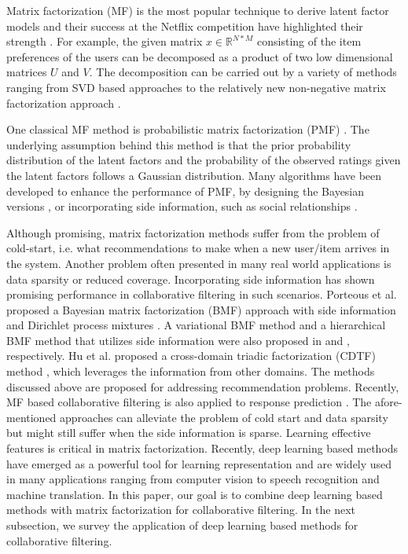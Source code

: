 \documentclass{sig-alternate-05-2015}
\begin{document}
Matrix factorization (MF) is the most popular technique to derive latent factor models and
their success at the Netflix competition have highlighted their strength \cite{koren2009matrix, bennett2007netflix}.
For example, the given matrix $x \in \mathbb{R}^{N*M}$ consisting of the item preferences of the users
can be decomposed as a product of two low dimensional matrices $U$ and $V$.
The decomposition can be carried out by a variety of methods ranging from SVD based approaches \cite{mazumder2010spectral}
to the relatively new non-negative matrix factorization approach \cite{lee2001algorithms}.

One classical MF method is probabilistic matrix factorization (PMF) \cite{salakhutdinov2011probabilistic}.
The underlying assumption behind this method is that
the prior probability distribution of the latent factors and
the probability of the observed ratings given the latent factors
follows a Gaussian distribution.
Many algorithms have been developed to enhance the performance of PMF,
by designing the Bayesian versions \cite{salakhutdinov2008bayesian, xu2013fast, shi2013scmf},
or incorporating side information, such as social relationships \cite{zhao2014leveraging, ma2011recommender}.

Although promising, matrix factorization methods suffer from the problem of cold-start,
i.e. what recommendations to make when a new user/item arrives in the system.
Another problem often presented in many real world applications is data sparsity
or reduced coverage.
Incorporating side information has shown promising performance
in collaborative filtering in such scenarios.
Porteous et al. proposed a Bayesian matrix factorization (BMF) approach
with side information and Dirichlet process mixtures \cite{porteous2010bayesian}.
A variational BMF method and a hierarchical BMF method that utilizes
side information were also proposed in \cite{kim2014scalable} and \cite{park2013hierarchical}, respectively.
Hu et al. proposed a cross-domain triadic factorization (CDTF)
method \cite{hu2013personalized}, which leverages the information from other domains.
The methods discussed above are proposed for addressing recommendation
problems.
Recently, MF based collaborative filtering is also applied to response prediction \cite{menon2011response, li2015predicting}.
The afore-mentioned approaches can alleviate the problem of cold start
and data sparsity but might still suffer when the side information is sparse.
Learning effective features is critical in matrix factorization.
Recently, deep learning based methods have emerged as a powerful tool
for learning representation and are widely used in many applications
ranging from computer vision to speech recognition and machine translation.
In this paper, our goal is to combine deep learning based methods with
matrix factorization for collaborative filtering.
In the next subsection, we survey the application of deep learning
based methods for collaborative filtering.
\end{document}
